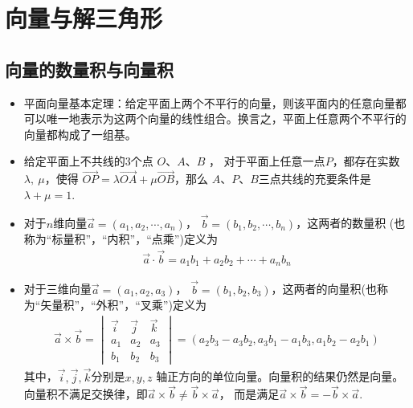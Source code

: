 \chapter{向量与解三角形}

\section{向量的数量积与向量积}
\begin{itemize}[leftmargin=\inteval{\myitemleftmargin}pt,itemsep=
   \inteval{\myitemitempsep}pt,topsep=\inteval{\myitemtopsep}pt]

\item 平面向量基本定理：给定平面上两个不平行的向量，则该平面内的任意向量都可以唯一地表示为这两个向量的线性组合。换言之，平面上任意两个不平行的向量都构成了一组基。

\item 给定平面上不共线的3个点 $ O $、$ A $、$ B $ ，
对于平面上任意一点$ P $，都存在实数$ \lambda,\ \mu $，使得
$ \vec{OP}=\lambda\vec{OA}+\mu\vec{OB} $，那么
$ A $、$ P $、$ B $三点共线的充要条件是$ \lambda+\mu=1 $.

\item 对于$ n $维向量$ \vec{a}=(a_1,a_2,\cdots,a_n) $，
$ \vec{b}=(b_1,b_2,\cdots,b_n) $，这两者的数量积
(也称为“标量积”，“内积”，“点乘”)定义为
\begin{gather*}
    \vec{a}\cdot \vec{b}=a_1b_1+a_2b_2+\cdots+a_nb_n
\end{gather*}

\item 对于三维向量$ \vec{a}=(a_1,a_2,a_3) $，
$ \vec{b}=(b_1,b_2,b_3) $，这两者的向量积(也称为“矢量积”，“外积”，“叉乘”)定义为
\begin{align}\label{三维向量叉乘}
    \vec{a}\times\vec{b} =
    \begin{vmatrix}
        \vec{i} & \vec{j} & \vec{k} \\
        a_1 & a_2 & a_3 \\
        b_1 & b_2 & b_3
    \end{vmatrix}
    =(a_2b_3-a_3b_2,a_3b_1-a_1b_3, a_1b_2-a_2b_1)
\end{align}
其中，$ \vec{i},\vec{j},\vec{k} $分别是$ x,y,z $
轴正方向的单位向量。向量积的结果仍然是向量。
向量积不满足交换律，即$ \vec{a}\times
\vec{b}\neq \vec{b}\times\vec{a} $，
而是满足$ \vec{a}\times \vec{b}=-\vec{b}
\times\vec{a} $. 


\end{itemize}
